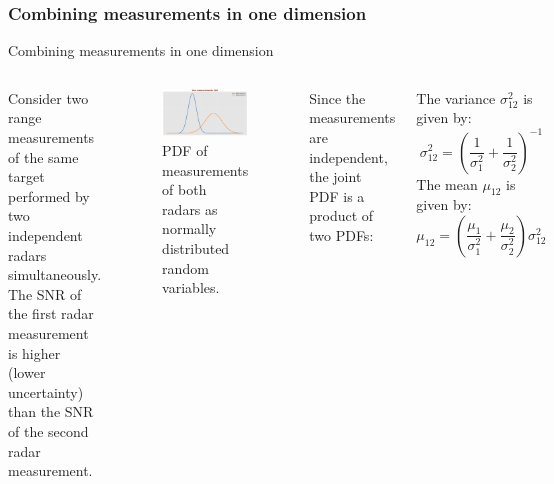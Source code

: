 \subsubsection{Combining measurements in one dimension}
\begin{frame}{Combining measurements in one dimension}
    \begin{columns}
        Consider two range measurements of the same target performed by two independent radars simultaneously. The SNR of the first radar measurement is higher (lower uncertainty) than the SNR of the second radar measurement. 
        \begin{figure}
            \centering
            \includegraphics[width=0.5\linewidth]{Figures//Part4/TwoMeasurementsPDFs.png}
            \vspace{-10pt}
            \caption{PDF of measurements of both radars as normally distributed random variables.}
            \vspace{-10pt}
        \end{figure}

        Since the measurements are independent, the joint PDF is a product of two PDFs: 
        
        The variance \( \sigma^2_{12} \) is given by:
    \begin{equation*}
        \sigma^2_{12} = \left( \frac{1}{\sigma^2_1} + \frac{1}{\sigma^2_2} \right)^{-1}
    \end{equation*}
        The mean \( \mu_{12} \) is given by:
        \begin{equation*}
            \mu_{12} = \left( \frac{\mu_1}{\sigma^2_1} + \frac{\mu_2}{\sigma^2_2} \right) \sigma^2_{12}
        \end{equation*}
    


\end{columns}
\end{frame}
